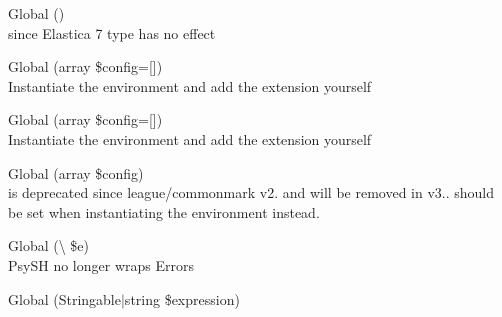 \begin{DoxyRefList}
\item[Global \doxylink{class_monolog_1_1_formatter_1_1_elastica_formatter_a830b5c75df72b32396701bc563fbe3c7}{Elastica\+Formatter\+::get\+Type} ()]\hfill \\
\label{deprecated__deprecated000174}%
%
since Elastica 7 type has no effect  
\item[Global \doxylink{class_league_1_1_common_mark_1_1_environment_1_1_environment_aa35b8709fb0133cc336cfb77e573637f}{Environment\+::create\+Common\+Mark\+Environment} (array \$config=\mbox{[}\mbox{]})]\hfill \\
\label{deprecated__deprecated000131}%
%
Instantiate the environment and add the extension yourself 
\item[Global \doxylink{class_league_1_1_common_mark_1_1_environment_1_1_environment_a84d2c79427667e2c583da9d42fd189bf}{Environment\+::create\+GFMEnvironment} (array \$config=\mbox{[}\mbox{]})]\hfill \\
\label{deprecated__deprecated000132}%
%
Instantiate the environment and add the extension yourself 
\item[Global \doxylink{class_league_1_1_common_mark_1_1_environment_1_1_environment_aa52db437dc14c854eb4a34ee9349f20c}{Environment\+::merge\+Config} (array \$config)]\hfill \\
\label{deprecated__deprecated000130}%
%
 is deprecated since league/commonmark v2. and will be removed in v3..  should be set when instantiating the environment instead. 
\item[Global \doxylink{class_psy_1_1_exception_1_1_error_exception_a29abc0440d44922f1e6ea1fb80376266}{Error\+Exception\+::from\+Error} (\textbackslash{}\doxylink{class_php_parser_1_1_error}{Error} \$e)]\hfill \\
\label{deprecated__deprecated000335}%
%
Psy\+SH no longer wraps Errors 
\item[Global \doxylink{class_league_1_1_uri_1_1_uri_template_1_1_expression_a90fcb4a4bceb89d2e455ae9753e507d8}{Expression\+::create\+From\+String} (Stringable\texorpdfstring{$\vert$}{|}string \$expression)]\hfill \\
\label{deprecated__deprecated000156}%

\end{DoxyRefList}
